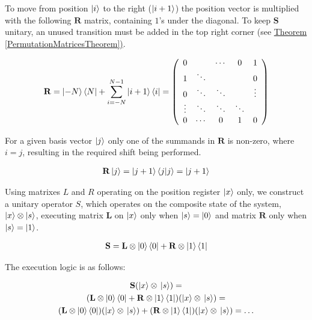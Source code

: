 \begin{definition}

To move from position $\ket{i}$ to the right ($\ket{i+1}$) the position vector is multiplied with the following $\mathbf{R}$ matrix, containing $1$'s under the diagonal. To keep $\mathbf{S}$ unitary, an unused transition must be added in the top right corner (see \hyperref[PermutationMatricesTheorem]{Theorem \ref{PermutationMatricesTheorem})}.

\begin{align}
\label{RightShift}
\mathbf{R} = \ket{-N}\bra{N} + \sum\limits_{i=-N}^{N-1} \ket{i+1}\bra{i} =
\left(
    \begin{array}{ccccc}
        0      &        & \cdots & 0      & 1      \\
        1      & \ddots &        &        & 0      \\
        0      & \ddots & \ddots &        & \vdots \\
        \vdots & \ddots & \ddots & \ddots &        \\
        0      & \cdots & 0      & 1      & 0
      \end{array}
\right)
\end{align}

For a given basis vector $\ket{j}$ only one of the summands in $\mathbf{R}$ is non-zero, where $i=j$, resulting in the required shift being performed.

\begin{align*}
\mathbf{R}\ket{j} = \ket{j+1}\bra{j}\ket{j} = \ket{j+1}
\end{align*}

\end{definition}


Using matrixes $L$ and $R$ operating on the position register $\ket{x}$ only, we construct a unitary operator $S$, which operates on the composite state of the system, $\ket{x} \otimes \ket{s}$, executing matrix $\mathbf{L}$ on $\ket{x}$ only when $\ket{s} = \ket{0}$ and matrix $\mathbf{R}$ only when $\ket{s}=\ket{1}$.

\begin{align}
\label{ShiftOperator}
  \mathbf{S} = \mathbf{L}\otimes\ket{0}\bra{0} + \mathbf{R}\otimes\ket{1}\bra{1}
\end{align}

The execution logic is as follows:

\begin{gather*}
    \mathbf{S}(\ket{x}\otimes{}\ket{s}) = \\
    (\mathbf{L}\otimes\ket{0}\bra{0} + \mathbf{R}\otimes\ket{1}\bra{1})(\ket{x}\otimes{}\ket{s}) = \\ (\mathbf{L}\otimes\ket{0}\bra{0})(\ket{x}\otimes{}\ket{s}) + (\mathbf{R}\otimes\ket{1}\bra{1})(\ket{x}\otimes{}\ket{s}) = \dots
\end{gather*}


